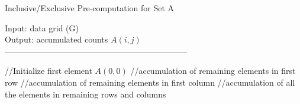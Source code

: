 \documentclass[10pt,journal,cspaper,compsoc]{IEEEtran}
\begin{document}
\begin{algorithm}[t!]\small
\label{pre1}
\caption{Inclusive/Exclusive Pre-computation for Set A}\label{pre1}
Input: data grid (G) \\
Output: accumulated counts $A(i,j)$\\
------------------------------------------------------------------ \\
\begin{algorithmic}[1]
\STATE //Initialize first element $A(0,0)$
\STATE //accumulation of remaining elements in first row
\ENDFOR
\STATE //accumulation of remaining elements in first column
\ENDFOR
\STATE //accumulation of all the elements in remaining rows and columns
\ENDFOR
{}
\ENDFOR
\ENDFOR
\end{algorithmic}
\end{algorithm}
\end{document}
